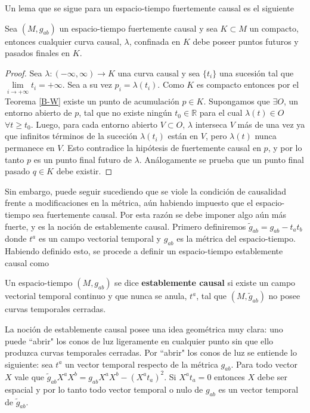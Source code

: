Un lema que se sigue para un espacio-tiempo fuertemente causal es el siguiente

\begin{lemma}\label{lema 8.2.1 Wald}
Sea $(M,g_{ab})$ un espacio-tiempo fuertemente causal y sea $K\subset M$ un compacto, entonces cualquier curva causal, $\lambda$, confinada en $K$ debe poseer puntos futuros y pasados finales en $K$.  
\end{lemma}
\begin{proof}
Sea $\lambda:(-\infty,\infty)\rightarrow K$ una curva causal y sea $\{t_i\}$ una sucesión tal que $\lim\limits_{i\rightarrow +\infty}t_i=+\infty$. Sea a su vez $p_i=\lambda(t_i)$. Como $K$ es compacto entonces por el Teorema \ref{B-W} existe un punto de acumulación $p\in K$. Supongamos que $\exists O$, un entorno abierto de $p$, tal que no existe ningún $t_0 \in \mathbb{R}$ para el cual $\lambda(t)\in O$ $\forall t\geq t_0$. Luego, para cada entorno abierto $V\subset O$, $\lambda$ interseca $V$ más de una vez ya que infinitos términos de la suceción $\lambda(t_i)$ están en $V$, pero $\lambda(t)$ nunca permanece en $V$. Esto contradice la hipótesis de fuertemente causal en $p$, y por lo tanto $p$ es un punto final futuro de $\lambda$. Análogamente se prueba que un punto final pasado $q\in K$ debe existir.
\end{proof}

Sin embargo, puede seguir sucediendo que se viole la condición de causalidad frente a modificaciones en la métrica, aún habiendo impuesto que el espacio-tiempo sea fuertemente causal. Por esta razón se debe imponer algo aún más fuerte, y es la noción de establemente causal. Primero definiremos $\tilde{g}_{ab}=g_{ab}-t_at_b$ donde $t^a$ es un campo vectorial temporal y $g_{ab}$ es la métrica del espacio-tiempo. Habiendo definido esto, se procede a definir un espacio-tiempo establemente causal como

\begin{definition}
Un espacio-tiempo $(M,g_{ab})$ se dice \textbf{establemente causal} si existe un campo vectorial temporal continuo y que nunca se anula, $t^a$, tal que $(M,\tilde{g}_{ab})$ no posee curvas temporales cerradas.
\end{definition}

La noción de establemente causal posee una idea geométrica muy clara: uno puede ``abrir" los conos de luz ligeramente en cualquier punto sin que ello produzca curvas temporales cerradas. Por ``abrir" los conos de luz se entiende lo siguiente: sea $t^a$ un vector temporal respecto de la métrica $g_{ab}$. Para todo vector $X$ vale que $\tilde{g}_{ab}X^aX^b=g_{ab}X^aX^b-(X^at_a)^2$. Si $X^at_a=0$ entonces $X$ debe ser espacial y por lo tanto todo vector temporal o nulo de $g_{ab}$ es un vector temporal de $\tilde{g}_{ab}$.

